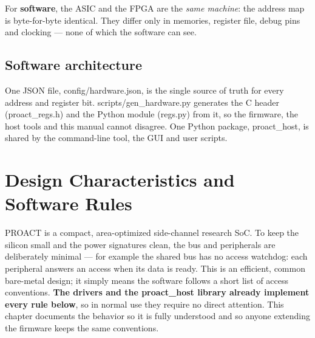 \documentclass[11pt,a4paper]{report}
\newcommand{\code}[1]{{\ttfamily\small #1}}
\begin{document}
\begin{center}
{}
\end{center}

\begin{factbox}
For \textbf{software}, the ASIC and the FPGA are the \emph{same machine}: the
address map is byte-for-byte identical. They differ only in memories, register
file, debug pins and clocking --- none of which the software can see.
\end{factbox}

\section{Software architecture}
One JSON file, \code{config/hardware.json}, is the single source of truth for
every address and register bit. \code{scripts/gen\_hardware.py} generates the
C header (\code{proact\_regs.h}) and the Python module (\code{regs.py}) from it,
so the firmware, the host tools and this manual cannot disagree. One Python
package, \code{proact\_host}, is shared by the command-line tool, the GUI and
user scripts.

\chapter{Design Characteristics and Software Rules}
PROACT is a compact, area-optimized side-channel research SoC. To keep the
silicon small and the power signatures clean, the bus and peripherals are
deliberately minimal --- for example the shared bus has no access watchdog: each
peripheral answers an access when its data is ready. This is an efficient,
common bare-metal design; it simply means the software follows a short list of
access conventions. \textbf{The drivers and the \code{proact\_host} library
already implement every rule below}, so in normal use they require no direct attention.
This chapter documents the behavior so it is fully understood and so anyone
extending the firmware keeps the same conventions.

\begin{center}
\end{center}
\end{document}
